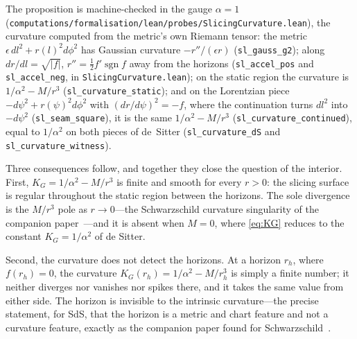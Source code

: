 \documentclass[11pt,a4paper]{article}
\theoremstyle{definition}
\begin{document}
The proposition is machine-checked in the gauge $\alpha=1$ (\texttt{computations/formalisation/lean/probes/SlicingCurvature.lean}), the curvature computed from the metric's own Riemann tensor: the metric $\epsilon\,dl^{2}+r(l)^{2}d\phi^{2}$ has Gaussian curvature $-r''/(\epsilon r)$ (\texttt{sl\_gauss\_g2}); along $dr/dl=\sqrt{\lvert f\rvert}$, $r''=\tfrac12f'\operatorname{sgn}f$ away from the horizons (\texttt{sl\_accel\_pos} and \texttt{sl\_accel\_neg}, in \texttt{SlicingCurvature.lean}); on the static region the curvature is $1/\alpha^{2}-M/r^{3}$ (\texttt{sl\_curvature\_static}); and on the Lorentzian piece $-d\psi^{2}+r(\psi)^{2}d\phi^{2}$ with $(dr/d\psi)^{2}=-f$, where the continuation turns $dl^{2}$ into $-d\psi^{2}$ (\texttt{sl\_seam\_square}), it is the same $1/\alpha^{2}-M/r^{3}$ (\texttt{sl\_curvature\_continued}), equal to $1/\alpha^{2}$ on both pieces of de~Sitter (\texttt{sl\_curvature\_dS} and \texttt{sl\_curvature\_witness}).

Three consequences follow, and together they close the question of the interior. First, $K_{G}=1/\alpha^{2}-M/r^{3}$ is finite and smooth for every $r>0$: the slicing surface is regular throughout the static region between the horizons. The sole divergence is the $M/r^{3}$ pole as $r\to0$---the Schwarzschild curvature singularity of the companion paper~\cite{JanzenCircle}---and it is absent when $M=0$, where \eqref{eq:KG} reduces to the constant $K_{G}=1/\alpha^{2}$ of de Sitter.

Second, the curvature does not detect the horizons. At a horizon $r_{h}$, where $f(r_{h})=0$, the curvature $K_{G}(r_{h})=1/\alpha^{2}-M/r_{h}^{3}$ is simply a finite number; it neither diverges nor vanishes nor spikes there, and it takes the same value from either side. The horizon is invisible to the intrinsic curvature---the precise statement, for SdS, that the horizon is a metric and chart feature and not a curvature feature, exactly as the companion paper found for Schwarzschild~\cite{JanzenBHcausality}.
\end{document}
